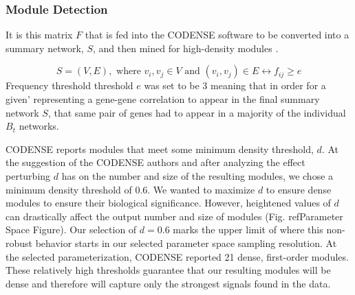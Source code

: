 \documentclass[10pt,letterpaper]{article}
\begin{document}
\subsubsection{Module Detection}
It is this matrix $F$ that is fed into the CODENSE software to be converted into a summary network, $S$, and then mined for high-density modules \cite{Hu2005}.  

\begin{equation}\label{equation6}
S=(V,E), \text{ where } v_i,v_j \in V \text{ and } (v_i,v_j) \in E \leftrightarrow f_{ij} \ge e
\end{equation}
Frequency threshold threshold $e$ was set to be 3 meaning that in order for a given'
representing a gene-gene correlation to appear in the final summary network $S$, that same pair of genes had to appear in a majority of the individual $B_t$ networks. 

CODENSE reports modules that meet some minimum density threshold, $d$. At the suggestion of the CODENSE authors and after analyzing the effect perturbing $d$ has on the number and size of the resulting modules, we chose a minimum density threshold of 0.6. We wanted to maximize $d$ to ensure dense modules to ensure their biological significance. However, heightened values of $d$ can drastically affect the output number and size of modules (Fig. ref{Parameter Space Figure}). Our selection of $d = 0.6$ marks the upper limit of where this non-robust behavior starts in our selected parameter space sampling resolution. At the selected parameterization, CODENSE reported 21 dense, first-order modules. These relatively high thresholds  guarantee that our resulting modules will be dense and therefore will capture only the strongest signals found in the data.
\end{document}
